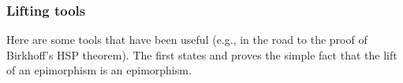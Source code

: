 \subsubsection{Lifting tools}\label{lifting-tools}

Here are some tools that have been useful (e.g., in the road to the proof of Birkhoff's HSP theorem).
The first states and proves the simple fact that the lift of an epimorphism is an epimorphism.
\ccpad
\begin{code}%
\>[1]\AgdaSpace{}%
\AgdaSymbol{:}%
\>[208I]\AgdaSymbol{(}\AgdaSpace{}%
\AgdaSymbol{:}\AgdaSpace{}%
\AgdaSymbol{)\{}\AgdaSpace{}%
\AgdaSymbol{:}\AgdaSpace{}%
\AgdaSymbol{\}}\<%
\\
\>[.][@{}l@{}]\<[208I]%
\>[28]\AgdaSymbol{\{}\AgdaSpace{}%
\AgdaSymbol{:}\AgdaSpace{}%
\AgdaSpace{}%
\AgdaSpace{}%
\AgdaSymbol{\}(}\AgdaSpace{}%
\AgdaSymbol{:}\AgdaSpace{}%
\AgdaSpace{}%
\AgdaSpace{}%
\AgdaSymbol{)(}\AgdaSpace{}%
\AgdaSymbol{:}\AgdaSpace{}%
\AgdaSpace{}%
\AgdaSpace{}%
\AgdaSymbol{)}\<%
\\
%
\>[28]\AgdaComment{-----------------------------------------------}\<%
\\
\>[1][@{}l@{\AgdaIndent{0}}]%
\>[2]%
\>[28]\AgdaSpace{}%
\AgdaSpace{}%
\AgdaSpace{}%
%
\>[40]%
\>[43]\AgdaSpace{}%
\AgdaSpace{}%
\AgdaSpace{}%
\AgdaSpace{}%
\AgdaSpace{}%
\AgdaSpace{}%
\AgdaSpace{}%
\<%
\\
%
\\[\AgdaEmptyExtraSkip]%
%
\>[1]\AgdaSpace{}%
\AgdaSpace{}%
\AgdaSymbol{\{}\AgdaSymbol{\}}\AgdaSpace{}%
\AgdaSymbol{\{}\AgdaSymbol{\}}\AgdaSpace{}%
\AgdaSpace{}%
\AgdaSpace{}%
\AgdaSpace{}%
\AgdaSpace{}%
\AgdaSymbol{=}\AgdaSpace{}%
\AgdaSpace{}%
\AgdaSpace{}%
\AgdaSymbol{(}\AgdaSpace{}%
\AgdaSymbol{)}\AgdaSpace{}%
\<%

\end{code}

